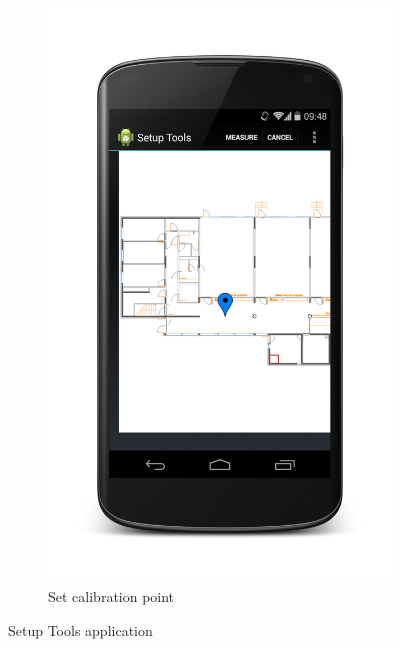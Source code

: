 \begin{figure}[h]
\begin{subfigure}[b]{0.3\textwidth}
                \includegraphics[scale=0.1]{./android/Setup.png}
                \caption{Set calibration point}
                \label{fig:map}
        \end{subfigure}
        \caption{Setup Tools application}\label{fig:setup}
\end{figure}

